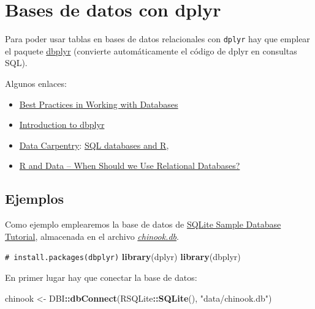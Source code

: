 \documentclass[
]{book}
\newenvironment{Shaded}{\begin{snugshade}}{\end{snugshade}}
\newcommand{\CommentTok}[1]{\textcolor[rgb]{0.56,0.35,0.01}{\textit{#1}}}
\newcommand{\FunctionTok}[1]{\textcolor[rgb]{0.13,0.29,0.53}{\textbf{#1}}}
\newcommand{\NormalTok}[1]{#1}
\newcommand{\OtherTok}[1]{\textcolor[rgb]{0.56,0.35,0.01}{#1}}
\newcommand{\SpecialCharTok}[1]{\textcolor[rgb]{0.81,0.36,0.00}{\textbf{#1}}}
\newcommand{\StringTok}[1]{\textcolor[rgb]{0.31,0.60,0.02}{#1}}
\theoremstyle{break}
\theoremstyle{nonumberplain}
\renewcommand{\CommentTok}[1]{\textcolor[rgb]{0.41,0.41,0.41}{\texttt{#1}}}
\begin{document}
\section{Bases de datos con dplyr}\label{dbplyr}

Para poder usar tablas en bases de datos relacionales con \texttt{dplyr} hay que emplear el paquete \href{https://dbplyr.tidyverse.org}{dbplyr} (convierte automáticamente el código de dplyr en consultas SQL).

Algunos enlaces:

\begin{itemize}
\item
  \href{https://solutions.posit.co/connections/db}{Best Practices in Working with Databases}
\item
  \href{https://dbplyr.tidyverse.org/articles/dbplyr.html}{Introduction to dbplyr}
\item
  \href{https://datacarpentry.org/R-ecology-lesson/index.html}{Data Carpentry}:
  \href{https://datacarpentry.org/R-ecology-lesson/05-r-and-databases.html}{SQL databases and R},
\item
  \href{https://intellixus.com/2018/06/29/r-and-data-when-should-we-use-relational-databases}{R and Data -- When Should we Use Relational Databases?}
\end{itemize}

\subsection{Ejemplos}\label{ejemplos}

Como ejemplo emplearemos la base de datos de \href{https://www.sqlitetutorial.net/sqlite-sample-database/}{SQLite Sample Database Tutorial}, almacenada en el archivo \href{data/chinook.db}{\emph{chinook.db}}.

\begin{Shaded}
\begin{Highlighting}[]
\CommentTok{\# install.packages(\textquotesingle{}dbplyr\textquotesingle{})}
\FunctionTok{library}\NormalTok{(dplyr)}
\FunctionTok{library}\NormalTok{(dbplyr)}
\end{Highlighting}
\end{Shaded}

En primer lugar hay que conectar la base de datos:

\begin{Shaded}
\begin{Highlighting}[]
\NormalTok{chinook }\OtherTok{\textless{}{-}}\NormalTok{ DBI}\SpecialCharTok{::}\FunctionTok{dbConnect}\NormalTok{(RSQLite}\SpecialCharTok{::}\FunctionTok{SQLite}\NormalTok{(), }\StringTok{"data/chinook.db"}\NormalTok{)}
\end{Highlighting}
\end{Shaded}
\end{document}
